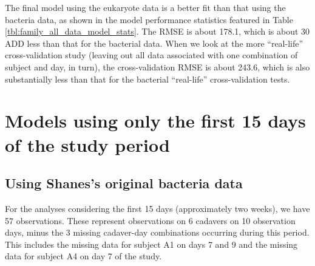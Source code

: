 \documentclass{article}
\begin{document}
The final model using the eukaryote data is a better fit than that
using the bacteria data, as shown in the model performance statistics
featured in Table \ref{tbl:family_all_data_model_stats}.  The RMSE is
about 178.1, which is about 30 ADD less than that for the bacterial
data.  When we look at the more ``real-life'' cross-validation study
(leaving out all data associated with one combination of subject and
day, in turn), the cross-validation RMSE is about 243.6, which is also
substantially less than that for the bacterial ``real-life''
cross-validation tests.




\section{Models using only the first 15 days of the study period}

\subsection{Using Shanes's original bacteria data}

For the analyses considering the first 15 days (approximately two
weeks), we have 57 observations.  These represent observations on 6
cadavers on 10 observation days, minus the 3 missing cadaver-day
combinations occurring during this period.  This includes the missing
data for subject A1 on days 7 and 9 and the missing data for subject
A4 on day 7 of the study.
\end{document}
